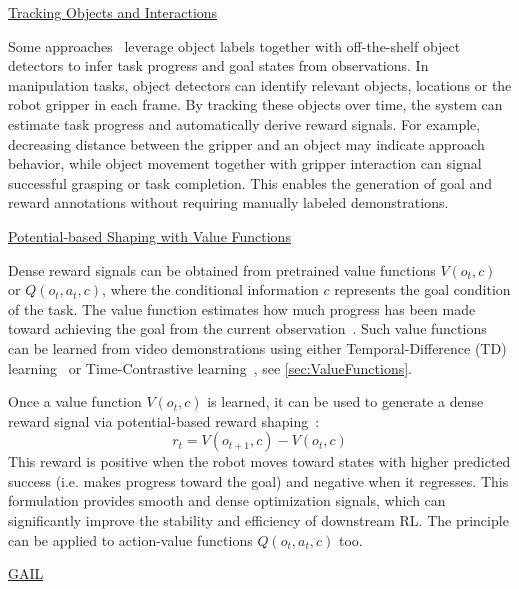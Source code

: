 \underline{Tracking Objects and Interactions}

Some approaches~\cite{Chang2020SemanticVN} leverage object labels together with off-the-shelf object detectors to infer task progress and goal states from observations. In manipulation tasks, object detectors can identify relevant objects, locations or the robot gripper in each frame. By tracking these objects over time, the system can estimate task progress and automatically derive reward signals. For example, decreasing distance between the gripper and an object may indicate approach behavior, while object movement together with gripper interaction can signal successful grasping or task completion. This enables the generation of goal and reward annotations without requiring manually labeled demonstrations.

\underline{Potential-based Shaping with Value Functions}

Dense reward signals can be obtained from pretrained value functions $V(o_t, c)$ or $Q(o_t, a_t, c)$, where the conditional information $c$ represents the goal condition of the task. The value function estimates how much progress has been made toward achieving the goal from the current observation~\cite{2022TowardsUV}.
Such value functions can be learned from video demonstrations using either Temporal-Difference (TD) learning~\cite{Chang2022LearningVF} or Time-Contrastive learning~\cite{Ma2022VIPTU}, see \autoref{sec:ValueFunctions}.

Once a value function $V(o_t, c)$ is learned, it can be used to generate a dense reward signal via potential-based reward shaping~\cite{McCarthy_2025}:
\begin{equation}
r_t = V(o_{t+1}, c) - V(o_t, c)
\end{equation}
This reward is positive when the robot moves toward states with higher predicted success (i.e. makes progress toward the goal) and negative when it regresses. This formulation provides smooth and dense optimization signals, which can significantly improve the stability and efficiency of downstream \ac{RL}.
The principle can be applied to action-value functions $Q(o_t, a_t, c)$ too.





\underline{\acf{GAIL}}

